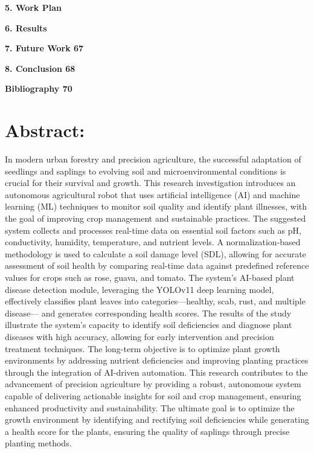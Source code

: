 \documentclass{book} %
\begin{document}
\noindent \textbf{5. Work Plan}

\noindent \textbf{6.  Results}

\noindent \textbf{7. Future Work                                                                                                                      67}

\noindent \textbf{8.  Conclusion                                                                                                                        68}

\noindent \textbf{Bibliography                                                                                                                          70}

\textbf{  }

\textbf{ }

\textbf{ }

\textbf{ }

\noindent 
\chapter{\eject Abstract:}

\noindent In modern urban forestry and precision agriculture, the successful adaptation of seedlings and saplings to evolving soil and microenvironmental conditions is crucial for their survival and growth. This research investigation introduces an autonomous agricultural robot that uses artificial intelligence (AI) and machine learning (ML) techniques to monitor soil quality and identify plant illnesses, with the goal of improving crop management and sustainable practices. The suggested system collects and processes real-time data on essential soil factors such as pH, conductivity, humidity, temperature, and nutrient levels. A normalization-based methodology is used to calculate a soil damage level (SDL), allowing for accurate assessment of soil health by comparing real-time data against predefined reference values for crops such as rose, guava, and tomato. The system's AI-based plant disease detection module, leveraging the YOLOv11 deep learning model, effectively classifies plant leaves into categories---healthy, scab, rust, and multiple disease--- and generates corresponding health scores. The results of the study illustrate the system's capacity to identify soil deficiencies and diagnose plant diseases with high accuracy, allowing for early intervention and precision treatment techniques. The long-term objective is to optimize plant growth environments by addressing nutrient deficiencies and improving planting practices through the integration of AI-driven automation. This research contributes to the advancement of precision agriculture by providing a robust, autonomous system capable of delivering actionable insights for soil and crop management, ensuring enhanced productivity and sustainability. The ultimate goal is to optimize the growth environment by identifying and rectifying soil deficiencies while generating a health score for the plants, ensuring the quality of saplings through precise planting methods.
\end{document}
